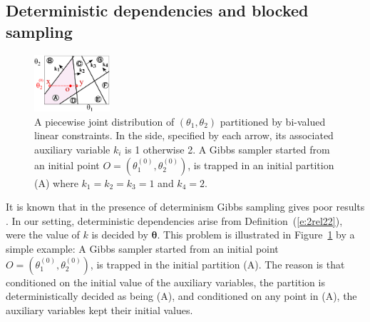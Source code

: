 \subsection{Deterministic dependencies and blocked sampling}
\label{sect:deterministic}
\begin{figure}
  \centering
  \includegraphics[width=0.25\textwidth]{pic/colxx.pdf}
\caption{\footnotesize
A piecewise joint distribution of $(\theta_1, \theta_2)$ partitioned by bi-valued linear constraints.
In the side, specified by each arrow, its associated auxiliary variable $k_i$ is 1 otherwise 2.
A Gibbs sampler started from an initial point $O = (\theta_1^{(0)}, \theta_2^{(0)})$, is trapped in an initial partition (A) 
where $k_1 = k_2 = k_3 = 1$ and $k_4 = 2$. 
}
\label{fig:simple.example}
\end{figure}
 It is known that in the presence of determinism Gibbs sampling gives poor results \cite{Poon:06}.
In our setting, deterministic dependencies arise from Definition~(\ref{e:2rel22}), were the value of $k$ is  decided by $\boldsymbol{\theta}$.
This problem is illustrated in Figure~\ref{fig:simple.example} by a simple example:
A Gibbs sampler started from an initial point $O=(\theta_1^{(0)}, \theta_2^{(0)})$, 
is trapped in the initial partition (A). 
The reason is that conditioned on the initial value of the auxiliary variables, 
the partition is deterministically decided as being (A), and conditioned on any 
point in (A), the auxiliary variables kept their initial values. %

